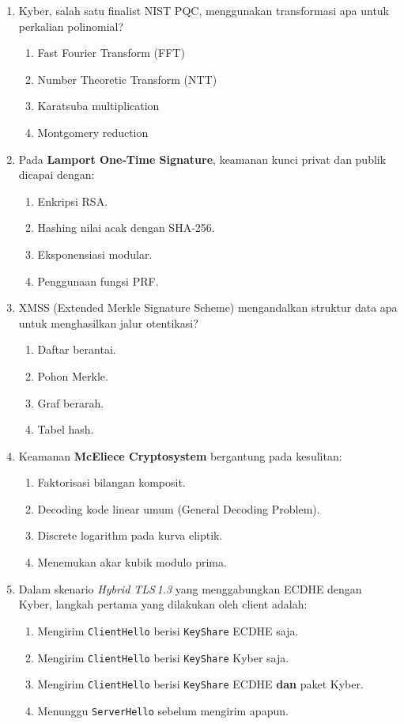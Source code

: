 \documentclass[12pt]{article}
\begin{document}
\begin{enumerate}[label=\textbf{Soal \arabic*.}, leftmargin=*, itemsep=1.5em]
\item Kyber, salah satu finalist NIST PQC, menggunakan transformasi apa untuk perkalian polinomial?
\begin{enumerate}[label=\Alph*.]
    \item Fast Fourier Transform (FFT)
    \item Number Theoretic Transform (NTT)
    \item Karatsuba multiplication
    \item Montgomery reduction
\end{enumerate}

\item Pada \textbf{Lamport One‑Time Signature}, keamanan kunci privat dan publik dicapai dengan:
\begin{enumerate}[label=\Alph*.]
    \item Enkripsi RSA.
    \item Hashing nilai acak dengan SHA‑256.
    \item Eksponensiasi modular.
    \item Penggunaan fungsi PRF.
\end{enumerate}

\item XMSS (Extended Merkle Signature Scheme) mengandalkan struktur data apa untuk menghasilkan jalur otentikasi?
\begin{enumerate}[label=\Alph*.]
    \item Daftar berantai.
    \item Pohon Merkle.
    \item Graf berarah.
    \item Tabel hash.
\end{enumerate}

\item Keamanan \textbf{McEliece Cryptosystem} bergantung pada kesulitan:
\begin{enumerate}[label=\Alph*.]
    \item Faktorisasi bilangan komposit.
    \item Decoding kode linear umum (General Decoding Problem).
    \item Discrete logarithm pada kurva eliptik.
    \item Menemukan akar kubik modulo prima.
\end{enumerate}

\item Dalam skenario \textit{Hybrid TLS 1.3} yang menggabungkan ECDHE dengan Kyber, langkah pertama yang dilakukan oleh client adalah:
\begin{enumerate}[label=\Alph*.]
    \item Mengirim \texttt{ClientHello} berisi \texttt{KeyShare} ECDHE saja.
    \item Mengirim \texttt{ClientHello} berisi \texttt{KeyShare} Kyber saja.
    \item Mengirim \texttt{ClientHello} berisi \texttt{KeyShare} ECDHE \textbf{dan} paket Kyber.
    \item Menunggu \texttt{ServerHello} sebelum mengirim apapun.
\end{enumerate}


\end{enumerate}
\end{document}
